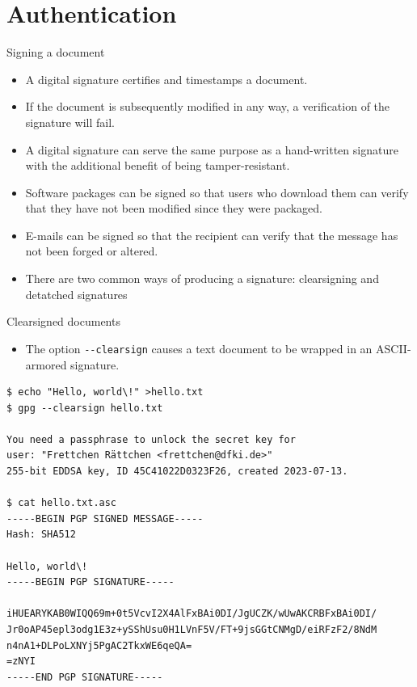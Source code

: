 \documentclass[
mode=present,
paper=smartboard,
size=20pt,
]{powerdot}
\newcommand\vsp{\vspace{-16mm}}
\newcommand{\clopt}[1]{\texttt{{-}#1}}
\begin{document}
\section{Authentication}

\begin{slide}{Signing a document}
  \begin{itemize}
  \item A digital signature certifies and timestamps a document.
  \item If the document is subsequently modified in any way, a
    verification of the signature will fail.
  \item A digital signature can serve the same purpose as a
    hand-written signature with the additional benefit of being
    tamper-resistant.
  \item Software packages can be signed so that users who download
    them can verify that they have not been modified since they were
    packaged.
  \item E-mails can be signed so that the recipient can verify that the
    message has not been forged or altered.
  \item There are two common ways of producing a signature:
    clearsigning and detatched signatures
  \end{itemize}
\end{slide}

\makeatletter\renewcommand{\verbatim@font}{\tiny\tt}\makeatother
\begin{slide}[method=direct]{Clearsigned documents}
  \begin{itemize}
  \item The option \clopt{-clearsign} causes a text document to be
    wrapped in an ASCII-armored signature.
  \end{itemize}
\vsp
\begin{verbatim}
$ echo "Hello, world\!" >hello.txt
$ gpg --clearsign hello.txt

You need a passphrase to unlock the secret key for
user: "Frettchen Rättchen <frettchen@dfki.de>"
255-bit EDDSA key, ID 45C41022D0323F26, created 2023-07-13.

$ cat hello.txt.asc
-----BEGIN PGP SIGNED MESSAGE-----
Hash: SHA512

Hello, world\!
-----BEGIN PGP SIGNATURE-----

iHUEARYKAB0WIQQ69m+0t5VcvI2X4AlFxBAi0DI/JgUCZK/wUwAKCRBFxBAi0DI/
Jr0oAP45epl3odg1E3z+ySShUsu0H1LVnF5V/FT+9jsGGtCNMgD/eiRFzF2/8NdM
n4nA1+DLPoLXNYj5PgAC2TkxWE6qeQA=
=zNYI
-----END PGP SIGNATURE-----
\end{verbatim}
\end{slide}
\end{document}
